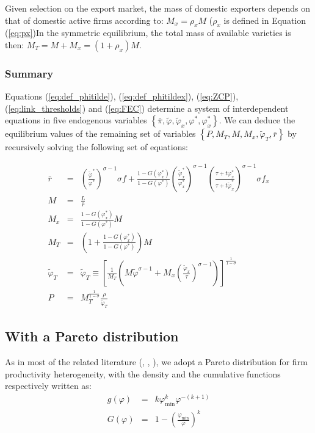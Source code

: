 \documentclass[a4paper,11pt]{article}
\begin{document}
Given selection on the export market, the mass of domestic exporters depends on that of domestic active firms according to: $M_x = \rho_x M$ ($\rho_x$ is defined in Equation (\ref{eq:px})In the symmetric equilibrium, the total mass of available varieties is then: $M_T= M+M_x = (1+\rho_x)M$.

\subsubsection{Summary}

Equations (\ref{eq:def_phitilde}), (\ref{eq:def_phitildex}), (\ref{eq:ZCP}), (\ref{eq:link_thresholds}) and (\ref{eq:FEC}) determine a system of interdependent equations in five endogenous variables $\left\{\bar{\pi}, \widetilde{\varphi}, \widetilde{\varphi}_x, \varphi^\ast, \varphi^\ast_x \right\}$. We can deduce the equilibrium values of the remaining set of variables $\left\{P, M_T, M, M_x, \widetilde{\varphi}_T, \bar{r} \right\}$ by recursively solving the following set of equations:

\begin{eqnarray*}
 \bar{r}&=& \left(\frac{\widetilde{\varphi}^\ast}{\varphi^\ast}\right)^{\sigma-1} \sigma f + \frac{1-G(\varphi^\ast_x)}{1-G(\varphi^\ast)}\left(\frac{\widetilde{\varphi}_x^\ast}{\varphi_x^\ast}\right)^{\sigma-1}\left(\frac{\tau+ t \varphi^\ast_x}{\tau+ t \widetilde{\varphi}^\ast_x}\right)^{\sigma-1} \sigma f_x \\
 M &=& \frac{L}{\bar{r}} \\
M_x &=& \frac{1-G(\varphi^\ast_x)}{1-G(\varphi^\ast)} M \\
M_T &=& \left(1+ \frac{1-G(\varphi^\ast_x)}{1-G(\varphi^\ast)} \right)M \\
\widetilde{\varphi}_T &=& \widetilde{\varphi}_T \equiv \left[\frac{1}{M_T}\left(M\widetilde{\varphi}^{\sigma-1} + M_x \left( \frac{\widetilde{\varphi}_x}{\tau} \right)^{\sigma-1} \right)  \right]^{\frac{1}{1-\sigma}} \\
P &=& M_T^{\frac{1}{1-\sigma}} \frac{\rho}{\widetilde{\varphi}_T}
\end{eqnarray*}


\subsection{With a Pareto distribution}


As in most of the related literature (\cite{Irrazabal_2015}, \cite{melitz-redding-Handbk-IT-2014}, \cite{ghironi}), we adopt a Pareto distribution for firm productivity heterogeneity, with the density and the cumulative functions respectively written as:
\begin{eqnarray*}
g(\varphi) &=& k\varphi_{\text{min}}^k \varphi^{-(k+1)}\\
G(\varphi) &=& 1 -\left( \frac{\varphi_{\text{min}}}{\varphi} \right)^k
\end{eqnarray*}
\end{document}
